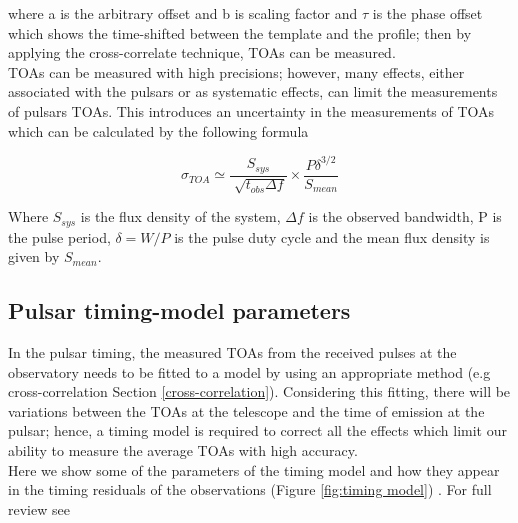 where a is the arbitrary offset and b is scaling factor and $\tau$ is the phase offset which shows the time-shifted between the template and the profile; then by applying the cross-correlate technique, TOAs can be measured.\\
TOAs can be measured with high precisions; however, many effects, either associated with the pulsars or as systematic effects, can limit the measurements of pulsars TOAs. This introduces an uncertainty in the measurements of TOAs which can be calculated by the following formula

\begin{equation}
\label{toa precision}
\sigma_{TOA} \simeq  \frac{S_{sys}}{\sqrt[]{t_{obs} \Delta f}}  \times \frac{P\delta^{3/2}}{S_{mean}}
\end{equation}

Where $S_{sys}$ is the flux density of the system, $\Delta f$ is the observed bandwidth, P is the pulse period, $\delta = W/P$ is the pulse duty cycle and the mean flux density is given by $S_{mean}$.





\subsection{Pulsar timing-model parameters}
In the pulsar timing, the measured TOAs from the received pulses at the observatory needs to be fitted to a model by using an appropriate method (e.g cross-correlation Section \ref{cross-correlation}). Considering this fitting, there will be variations between the TOAs at the telescope and the time of emission at the pulsar; hence, a timing model is required to correct all the effects which limit our ability to measure the average TOAs with high accuracy.\\
Here we show some of the parameters of the timing model and how they appear in the timing residuals of the observations (Figure \ref{fig:timing model}) . For full review see \citet{edwards2006tempo2}


